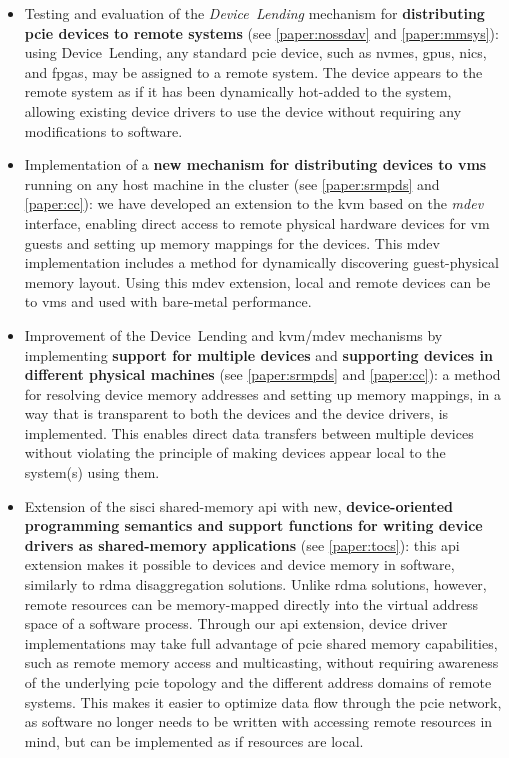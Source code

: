 \begin{itemize}
    \item Testing and evaluation of the \emph{Device~Lending} mechanism for \textbf{distributing \gls{pcie} devices to remote systems} (see \cref{paper:nossdav} and \cref{paper:mmsys}): 
        using Device~Lending, any standard \gls{pcie} device, such as \glspl{nvme}, \glspl{gpu}, \glspl{nic}, and \glspl{fpga}, may be assigned to a remote system. 
        The device appears to the remote system as if it has been dynamically hot-added to the system, allowing existing device drivers to use the device without requiring any modifications to software.

    \item Implementation of a \textbf{new mechanism for distributing devices to \glspl{vm}} running on any host machine in the cluster (see \cref{paper:srmpds} and \cref{paper:cc}): 
        we have developed an extension to the \gls{kvm} based on the \emph{\gls{mdev}} interface, enabling direct access to remote physical hardware devices for \gls{vm} guests and setting up memory mappings for the devices. 
        This \gls{mdev} implementation includes a method for dynamically discovering guest-physical memory layout. Using this \gls{mdev} extension, local and remote devices can be  to \glspl{vm} and used with bare-metal performance.
	
    \item Improvement of the Device~Lending and \gls{kvm}/\gls{mdev} mechanisms by implementing \textbf{support for multiple devices} and \textbf{supporting devices in different physical machines} (see \cref{paper:srmpds} and \cref{paper:cc}):
        a method for resolving device memory addresses and setting up memory mappings, in a way that is transparent to both the devices and the device drivers, is implemented. 
        This enables direct data transfers between multiple devices without violating the principle of making devices appear local to the system(s) using them.

    \item Extension of the \gls{sisci} shared-memory \gls{api} with new, \textbf{device-oriented programming semantics and support functions for writing device drivers as shared-memory applications} (see \cref{paper:tocs}):
	this \gls{api} extension makes it possible to  devices and device memory in software, similarly to \gls{rdma} \gls{disaggregation} solutions.
	Unlike \gls{rdma} solutions, however, remote resources can be memory-mapped directly into the virtual address space of a software process.
	Through our \gls{api} extension, device driver implementations may take full advantage of \gls{pcie} shared memory capabilities, such as remote memory access and multicasting, without requiring awareness of the underlying \gls{pcie} topology and the different address domains of remote systems.
	This makes it easier to optimize data flow through the \gls{pcie} network, as software no longer needs to be written with accessing remote resources in mind, but can be implemented as if resources are local.


\end{itemize}
